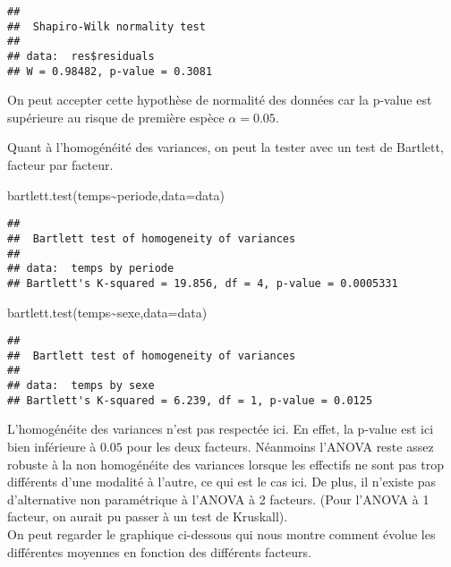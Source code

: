 \documentclass[
]{article}
\newenvironment{Shaded}{\begin{snugshade}}{\end{snugshade}}
\newcommand{\AttributeTok}[1]{\textcolor[rgb]{0.77,0.63,0.00}{#1}}
\newcommand{\FunctionTok}[1]{\textcolor[rgb]{0.00,0.00,0.00}{#1}}
\newcommand{\NormalTok}[1]{#1}
\newcommand{\SpecialCharTok}[1]{\textcolor[rgb]{0.00,0.00,0.00}{#1}}
\begin{document}
\begin{verbatim}
## 
##  Shapiro-Wilk normality test
## 
## data:  res$residuals
## W = 0.98482, p-value = 0.3081
\end{verbatim}

On peut accepter cette hypothèse de normalité des données car la p-value
est supérieure au risque de première espèce \(\alpha=0.05\).

Quant à l'homogénéité des variances, on peut la tester avec un test de
Bartlett, facteur par facteur.

\begin{Shaded}
\begin{Highlighting}[]
\FunctionTok{bartlett.test}\NormalTok{(temps}\SpecialCharTok{\textasciitilde{}}\NormalTok{periode,}\AttributeTok{data=}\NormalTok{data)}
\end{Highlighting}
\end{Shaded}

\begin{verbatim}
## 
##  Bartlett test of homogeneity of variances
## 
## data:  temps by periode
## Bartlett's K-squared = 19.856, df = 4, p-value = 0.0005331
\end{verbatim}

\begin{Shaded}
\begin{Highlighting}[]
\FunctionTok{bartlett.test}\NormalTok{(temps}\SpecialCharTok{\textasciitilde{}}\NormalTok{sexe,}\AttributeTok{data=}\NormalTok{data)}
\end{Highlighting}
\end{Shaded}

\begin{verbatim}
## 
##  Bartlett test of homogeneity of variances
## 
## data:  temps by sexe
## Bartlett's K-squared = 6.239, df = 1, p-value = 0.0125
\end{verbatim}

L'homogénéite des variances n'est pas respectée ici. En effet, la
p-value est ici bien inférieure à \(0.05\) pour les deux facteurs.
Néanmoins l'ANOVA reste assez robuste à la non homogénéite des variances
lorsque les effectifs ne sont pas trop différents d'une modalité à
l'autre, ce qui est le cas ici. De plus, il n'existe pas d'alternative
non paramétrique à l'ANOVA à 2 facteurs. (Pour l'ANOVA à 1 facteur, on
aurait pu passer à un test de Kruskall).\\

On peut regarder le graphique ci-dessous qui nous montre comment évolue
les différentes moyennes en fonction des différents facteurs.
\end{document}
